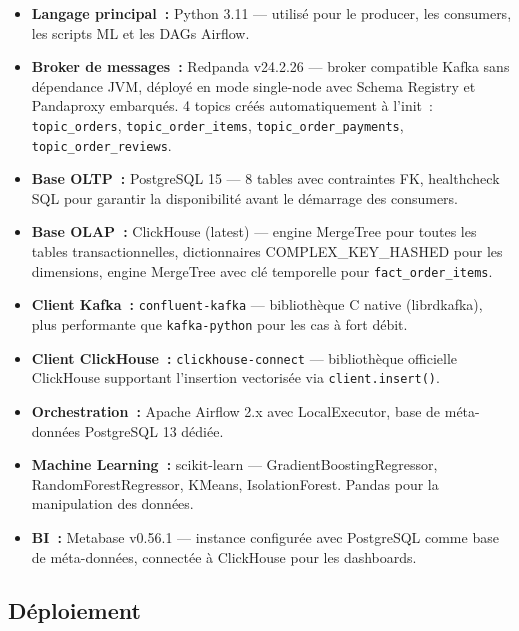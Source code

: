 \begin{itemize}
\renewcommand{\labelitemi}{$\bullet$}
  \setlength{\itemsep}{0.4em}

\item \textbf{Langage principal~:} Python 3.11 — utilisé pour le producer, les consumers, les scripts ML et les DAGs Airflow.

\item \textbf{Broker de messages~:} Redpanda v24.2.26 — broker compatible Kafka sans dépendance JVM, déployé en mode single-node avec Schema Registry et Pandaproxy embarqués. 4 topics créés automatiquement à l'init~: \texttt{topic\_orders}, \texttt{topic\_order\_items}, \texttt{topic\_order\_payments}, \texttt{topic\_order\_reviews}.

\item \textbf{Base OLTP~:} PostgreSQL 15 — 8 tables avec contraintes FK, healthcheck SQL pour garantir la disponibilité avant le démarrage des consumers.

\item \textbf{Base OLAP~:} ClickHouse (latest) — engine MergeTree pour toutes les tables transactionnelles, dictionnaires COMPLEX\_KEY\_HASHED pour les dimensions, engine MergeTree avec clé temporelle pour \texttt{fact\_order\_items}.

\item \textbf{Client Kafka~:} \texttt{confluent-kafka} — bibliothèque C native (librdkafka), plus performante que \texttt{kafka-python} pour les cas à fort débit.

\item \textbf{Client ClickHouse~:} \texttt{clickhouse-connect} — bibliothèque officielle ClickHouse supportant l'insertion vectorisée via \texttt{client.insert()}.

\item \textbf{Orchestration~:} Apache Airflow 2.x avec LocalExecutor, base de méta-données PostgreSQL 13 dédiée.

\item \textbf{Machine Learning~:} scikit-learn — GradientBoostingRegressor, RandomForestRegressor, KMeans, IsolationForest. Pandas pour la manipulation des données.

\item \textbf{BI~:} Metabase v0.56.1 — instance configurée avec PostgreSQL comme base de méta-données, connectée à ClickHouse pour les dashboards.

\end{itemize}

\subsection{Déploiement}

